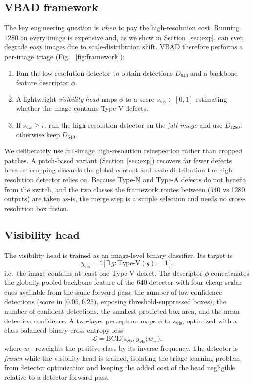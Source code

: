 \subsection{VBAD framework}
\label{sec:vbad}
The key engineering question is \emph{when} to pay the high-resolution cost.
Running $1280$ on every image is expensive and, as we show in
Section~\ref{sec:exp}, can even degrade easy images due to scale-distribution
shift. VBAD therefore performs a per-image triage (Fig.~
\ref{fig:framework}):
\begin{enumerate}[leftmargin=1.4em]
\item Run the low-resolution detector to obtain detections $D_{640}$ and a
backbone feature descriptor $\phi$.
\item A lightweight \emph{visibility head} maps $\phi$ to a score
$s_{\mathrm{vis}} \in [0, 1]$ estimating whether the image contains Type-V
defects.
\item If $s_{\mathrm{vis}} \ge \tau$, run the high-resolution detector on the
\emph{full image} and use $D_{1280}$; otherwise keep $D_{640}$.
\end{enumerate}
We deliberately use full-image high-resolution reinspection rather than cropped
patches. A patch-based variant (Section~\ref{sec:exp}) recovers far fewer
defects because cropping discards the global context and scale distribution the
high-resolution detector relies on. Because Type-N and Type-A defects do not
benefit from the switch, and the two classes the framework routes between
(640 vs 1280 outputs) are taken as-is, the merge step is a simple selection and
needs no cross-resolution box fusion.

\subsection{Visibility head}
\label{sec:vishead}
The visibility head is trained as an image-level binary classifier. Its target
is
\begin{equation}
y_{\mathrm{vis}} = \mathbb{1}\big[\,\exists\, g : \text{Type-V}(g) = 1\,\big],
\end{equation}
i.e.\ the image contains at least one Type-V defect. The descriptor $\phi$
concatenates the globally pooled backbone feature of the $640$ detector with
four cheap scalar cues available from the same forward pass: the number of
low-confidence detections (score in $[0.05, 0.25)$, exposing
threshold-suppressed boxes), the number of confident detections, the smallest
predicted box area, and the mean detection confidence. A two-layer perceptron
maps $\phi$ to $s_{\mathrm{vis}}$, optimized with a class-balanced binary
cross-entropy loss
\begin{equation}
\mathcal{L} = \mathrm{BCE}\big(s_{\mathrm{vis}}, y_{\mathrm{vis}}; w_{+}\big),
\end{equation}
where $w_{+}$ reweights the positive class by its inverse frequency. The
detector is \emph{frozen} while the visibility head is trained, isolating the
triage-learning problem from detector optimization and keeping the added cost
of the head negligible relative to a detector forward pass.

